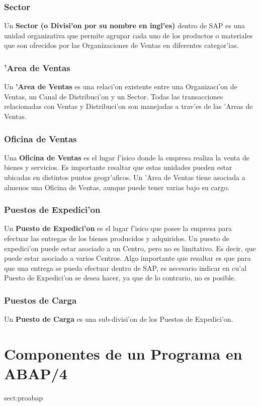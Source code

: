 \subsubsection{Sector}
	Un \textbf{Sector (o Divisi'on por su nombre en ingl'es)} dentro de SAP es una unidad organizativa que permite agrupar cada uno de los productos o materiales que son ofrecidos por las Organizaciones de Ventas en diferentes categor'ias. 
	
\subsubsection{'Area de Ventas}
	Un \textbf{'Area de Ventas} es una relaci'on existente entre una Organizaci'on de Ventas, un Canal de Distribuci'on y un Sector. Todas las transacciones relacionadas con Ventas y Distribuci'on son manejadas a trav'es de las 'Areas de Ventas.
	
\subsubsection{Oficina de Ventas}
	Una \textbf{Oficina de Ventas} es el lugar f'isico donde la empresa realiza la venta de bienes y servicios. Es importante resaltar que estas unidades pueden estar ubicadas en distintos puntos geogr'aficos. 
	Un 'Area de Ventas tiene asociada a almenos una Oficina de Ventas, aunque puede tener varias bajo su cargo.

\subsubsection{Puestos de Expedici'on}
	Un \textbf{Puesto de Expedici'on} es el lugar f'isico que posee la empresa para efectuar las entregas de los bienes producidos y adquiridos.
	Un puesto de expedici'on puede estar asociado a un Centro, pero no es limitativo. Es decir, que puede estar asociado a varios Centros.
	Algo importante que resaltar es que para que una entrega se pueda efectuar dentro de SAP, es necesario indicar en cu'al Puesto de Expedici'on se desea hacer, ya que de lo contrario, no es posible.
	
\subsubsection{Puestos de Carga}
	Un \textbf{Puesto de Carga} es una sub-divisi'on de los Puestos de Expedici'on. 

\section{Componentes de un Programa en ABAP/4}{sect:proabap}

